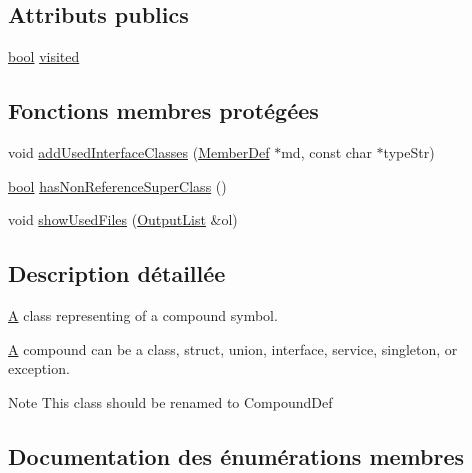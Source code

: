 \subsection*{Attributs publics}
\begin{DoxyCompactItemize}
\item 
\hyperlink{qglobal_8h_a1062901a7428fdd9c7f180f5e01ea056}{bool} \hyperlink{class_class_def_a8e46ff4cb96456e7d4c7bdf77aa6c874}{visited}
\end{DoxyCompactItemize}
\subsection*{Fonctions membres protégées}
\begin{DoxyCompactItemize}
\item 
void \hyperlink{class_class_def_a93186f9ffc007c6aa8b8fd620184c928}{add\+Used\+Interface\+Classes} (\hyperlink{class_member_def}{Member\+Def} $\ast$md, const char $\ast$type\+Str)
\item 
\hyperlink{qglobal_8h_a1062901a7428fdd9c7f180f5e01ea056}{bool} \hyperlink{class_class_def_a389451558606583f4eaab0eeaa563be9}{has\+Non\+Reference\+Super\+Class} ()
\item 
void \hyperlink{class_class_def_aef335dd744f22f66968fbda46d388d29}{show\+Used\+Files} (\hyperlink{class_output_list}{Output\+List} \&ol)
\end{DoxyCompactItemize}


\subsection{Description détaillée}
\hyperlink{class_a}{A} class representing of a compound symbol.

\hyperlink{class_a}{A} compound can be a class, struct, union, interface, service, singleton, or exception. \begin{DoxyNote}{Note}
This class should be renamed to Compound\+Def 
\end{DoxyNote}


\subsection{Documentation des énumérations membres}
\hypertarget{class_class_def_ae70cf86d35fe954a94c566fbcfc87939}{}

